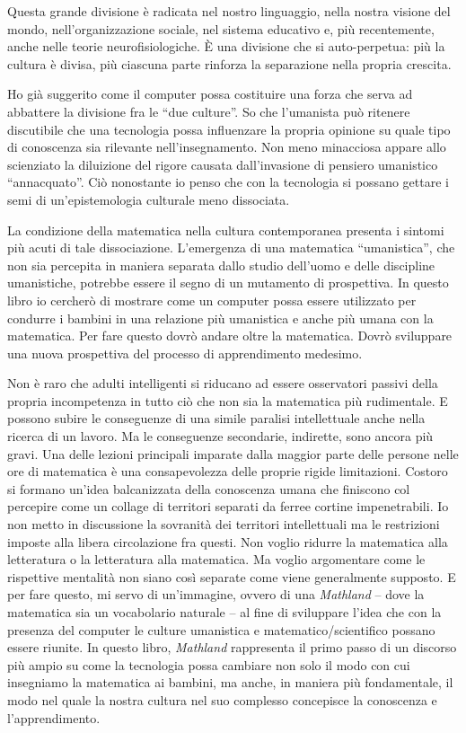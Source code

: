 Questa grande divisione è radicata nel nostro linguaggio, nella nostra visione del mondo, nell'organizzazione sociale, nel sistema educativo e, più recentemente, anche nelle teorie neurofisiologiche. È una divisione che si auto-perpetua: più la cultura è divisa, più ciascuna parte rinforza la separazione nella propria crescita.

Ho già suggerito come il computer possa costituire una forza che serva ad abbattere la divisione fra le “due culture”. So che l'umanista può ritenere discutibile che una tecnologia possa influenzare la propria opinione su quale tipo di conoscenza sia rilevante nell'insegnamento. Non meno minacciosa appare allo scienziato la diluizione del rigore causata dall'invasione di pensiero umanistico “annacquato”. Ciò nonostante io penso che con la tecnologia si possano gettare i semi di un'epistemologia culturale meno dissociata. 

La condizione della matematica nella cultura contemporanea presenta i sintomi più acuti di tale dissociazione. L'emergenza di una matematica “umanistica”, che non sia percepita in maniera separata dallo studio dell'uomo e delle discipline umanistiche, potrebbe essere il segno di un mutamento di prospettiva. In questo libro io cercherò di mostrare come un computer possa essere utilizzato per condurre i bambini in una relazione più umanistica e anche più umana con la matematica. Per fare questo dovrò andare oltre la matematica. Dovrò sviluppare una nuova prospettiva del processo di apprendimento medesimo. 

Non è raro che adulti intelligenti si riducano ad essere osservatori passivi della propria incompetenza in tutto ciò che non sia la matematica più rudimentale. E possono subire le conseguenze di una simile paralisi intellettuale anche nella ricerca di un lavoro. Ma le conseguenze secondarie, indirette, sono ancora più gravi. Una delle lezioni principali imparate dalla maggior parte delle persone nelle ore di matematica è una consapevolezza delle proprie rigide limitazioni. Costoro si formano un'idea balcanizzata della conoscenza umana che finiscono col percepire come un collage di territori separati da ferree cortine impenetrabili. Io non metto in discussione la sovranità dei territori intellettuali ma le restrizioni imposte alla libera circolazione fra questi. Non voglio ridurre la matematica alla letteratura o la letteratura alla matematica. Ma voglio argomentare come le rispettive mentalità non siano così separate come viene generalmente supposto. E per fare questo, mi servo di un'immagine, ovvero di una \textit{Mathland}  – dove la matematica sia un vocabolario naturale – al fine di sviluppare l'idea che con la presenza del computer le culture umanistica e matematico/scientifico possano essere riunite. In questo libro, \textit{Mathland} rappresenta il primo passo di un discorso più ampio su come la tecnologia possa cambiare non solo il modo con cui insegniamo la matematica ai bambini, ma anche, in maniera più fondamentale, il modo nel quale la nostra cultura nel suo complesso concepisce la conoscenza e l'apprendimento.

